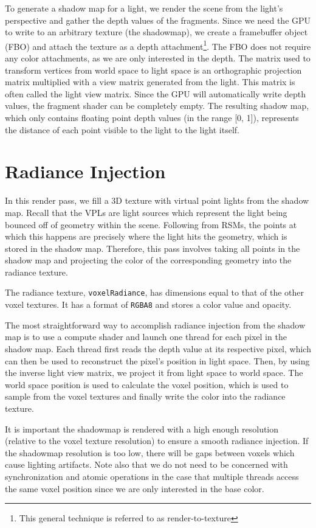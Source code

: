 To generate a shadow map for a light, we render the scene from the light's perspective and gather the depth values of the fragments. Since we need the GPU to write to an arbitrary texture (the shadowmap), we create a framebuffer object (FBO) and attach the texture as a depth attachment\footnote{This general technique is referred to as render-to-texture}. The FBO does not require any color attachments, as we are only interested in the depth. The matrix used to transform vertices from world space to light space is an orthographic projection matrix multiplied with a view matrix generated from the light. This matrix is often called the light view matrix. Since the GPU will automatically write depth values, the fragment shader can be completely empty. The resulting shadow map, which only contains floating point depth values (in the range [0, 1]), represents the distance of each point visible to the light to the light itself.

\section{Radiance Injection}
In this render pass, we fill a 3D texture with virtual point lights from the shadow map. Recall that the VPLs are light sources which represent the light being bounced off of geometry within the scene. Following from RSMs, the points at which this happens are precisely where the light hits the geometry, which is stored in the shadow map. Therefore, this pass involves taking all points in the shadow map and projecting the color of the corresponding geometry into the radiance texture.

The radiance texture, \texttt{voxelRadiance}, has dimensions equal to that of the other voxel textures. It has a format of \texttt{RGBA8} and stores a color value and opacity.

The most straightforward way to accomplish radiance injection from the shadow map is to use a compute shader and launch one thread for each pixel in the shadow map. Each thread first reads the depth value at its respective pixel, which can then be used to reconstruct the pixel's position in light space. Then, by using the inverse light view matrix, we project it from light space to world space. The world space position is used to calculate the voxel position, which is used to sample from the voxel textures and finally write the color into the radiance texture.

It is important the shadowmap is rendered with a high enough resolution (relative to the voxel texture resolution) to ensure a smooth radiance injection. If the shadowmap resolution is too low, there will be gaps between voxels which cause lighting artifacts. Note also that we do not need to be concerned with synchronization and atomic operations in the case that multiple threads access the same voxel position since we are only interested in the base color.

